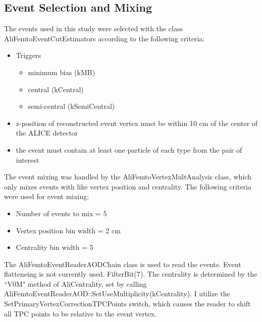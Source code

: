 \documentclass[../AnalysisNoteJBuxton.tex]{subfiles}
\begin{document}
\subsection{Event Selection and Mixing}
\label{EventSelection}

The events used in this study were selected with the class AliFemtoEventCutEstimators according to the following criteria:

\begin{itemize}
 \itemsep0em
 \item Triggers
 \begin{itemize}
  \itemsep0em
  \item minimum bias (kMB)
  \item central (kCentral)
  \item semi-central (kSemiCentral)
 \end{itemize}
 \item z-position of reconstructed event vertex must be within 10 cm of the center of the ALICE detector
 \item the event must contain at least one particle of each type from the pair of interest
\end{itemize}

The event mixing was handled by the AliFemtoVertexMultAnalysis class, which only mixes events with like vertex position and centrality.
The following criteria were used for event mixing:

\begin{itemize}
 \itemsep0em
 \item Number of events to mix = 5
 \item Vertex position bin width = 2 cm
 \item Centrality bin width = 5%
\end{itemize}

The AliFemtoEventReaderAODChain class is used to read the events.
Event flatteneing is not currently used.
FilterBit(7).
The centrality is determined by the ``V0M" method of AliCentrality, set by calling AliFemtoEventReaderAOD::SetUseMultiplicity(kCentrality).
I utilize the SetPrimaryVertexCorrectionTPCPoints switch, which causes the reader to shift all TPC points to be relative to the event vertex.
\end{document}
